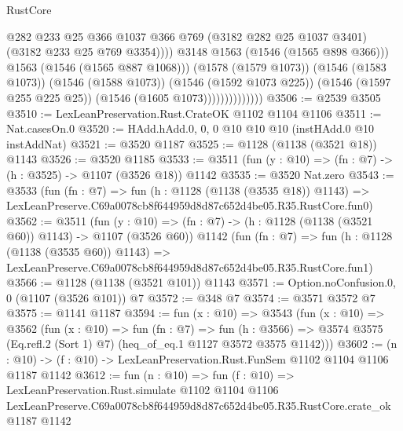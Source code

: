\begin{lexlean}{RustCore}
\begin{coremodule}
                                      @282
                                      @233
                                      @25
                                      @366
                                      @1037
                                      @366
                                      @769
                                      (@3182 @282 @25 @1037 @3401)
                                      (@3182 @233 @25 @769 @3354))))
                                @3148
                                @1563
                                (@1546 (@1565 @898 @366)))
                              @1563
                              (@1546 (@1565 @887 @1068)))
                            (@1578 (@1579 @1073))
                            (@1546 (@1583 @1073))
                            (@1546 (@1588 @1073))
                            (@1546 (@1592 @1073 @225))
                            (@1546 (@1597 @255 @225 @25))
                            (@1546 (@1605 @1073))))))))))))))
@3506 := @2539 @3505
@3510 := LexLeanPreservation.Rust.CrateOK @1102 @1104 @1106
@3511 := Nat.casesOn.{0}
@3520 := HAdd.hAdd.{0, 0, 0} @10 @10 @10 (instHAdd.{0} @10 instAddNat)
@3521 := @3520 @1187
@3525 := @1128 (@1138 (@3521 @18)) @1143
@3526 := @3520 @1185
@3533 := @3511 (fun (y : @10) => (fn : @7) -> (h : @3525) -> @1107 (@3526 @18)) @1142
@3535 := @3520 Nat.zero
@3543 := @3533
    (fun (fn : @7) =>
    fun (h : @1128 (@1138 (@3535 @18)) @1143) =>
    LexLeanPreserve.C69a0078cb8f644959d8d87c652d4be05.R35.RustCore.fun0)
@3562 := @3511
    (fun (y : @10) => (fn : @7) -> (h : @1128 (@1138 (@3521 @60)) @1143) -> @1107 (@3526 @60))
    @1142
    (fun (fn : @7) =>
    fun (h : @1128 (@1138 (@3535 @60)) @1143) =>
    LexLeanPreserve.C69a0078cb8f644959d8d87c652d4be05.R35.RustCore.fun1)
@3566 := @1128 (@1138 (@3521 @101)) @1143
@3571 := Option.noConfusion.{0, 0} (@1107 (@3526 @101)) @7
@3572 := @348 @7
@3574 := @3571 @3572 @7
@3575 := @1141 @1187
@3594 := fun (x : @10) =>
  @3543
    (fun (x : @10) =>
    @3562
      (fun (x : @10) =>
      fun (fn : @7) =>
      fun (h : @3566) =>
      @3574 @3575 (Eq.refl.{2} (Sort 1) @7) (heq_of_eq.{1} @1127 @3572 @3575 @1142)))
@3602 := (n : @10) -> (f : @10) -> LexLeanPreservation.Rust.FunSem @1102 @1104 @1106 @1187 @1142
@3612 := fun (n : @10) =>
  fun (f : @10) =>
  LexLeanPreservation.Rust.simulate
    @1102
    @1104
    @1106
    LexLeanPreserve.C69a0078cb8f644959d8d87c652d4be05.R35.RustCore.crate_ok
    @1187
    @1142
\end{coremodule}
\end{lexlean}
